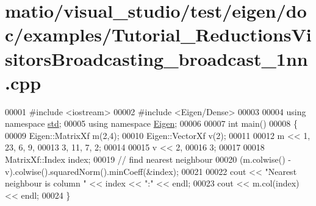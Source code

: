 \hypertarget{matio_2visual__studio_2test_2eigen_2doc_2examples_2_tutorial___reductions_visitors_broadcasting__broadcast__1nn_8cpp_source}{}\section{matio/visual\+\_\+studio/test/eigen/doc/examples/\+Tutorial\+\_\+\+Reductions\+Visitors\+Broadcasting\+\_\+broadcast\+\_\+1nn.cpp}
\label{matio_2visual__studio_2test_2eigen_2doc_2examples_2_tutorial___reductions_visitors_broadcasting__broadcast__1nn_8cpp_source}

\begin{DoxyCode}
00001 \textcolor{preprocessor}{#include <iostream>}
00002 \textcolor{preprocessor}{#include <Eigen/Dense>}
00003 
00004 \textcolor{keyword}{using namespace }\hyperlink{namespacestd}{std};
00005 \textcolor{keyword}{using namespace }\hyperlink{namespace_eigen}{Eigen};
00006 
00007 \textcolor{keywordtype}{int} main()
00008 \{
00009   Eigen::MatrixXf m(2,4);
00010   Eigen::VectorXf v(2);
00011   
00012   m << 1, 23, 6, 9,
00013        3, 11, 7, 2;
00014        
00015   v << 2,
00016        3;
00017 
00018   MatrixXf::Index index;
00019   \textcolor{comment}{// find nearest neighbour}
00020   (m.colwise() - v).colwise().squaredNorm().minCoeff(&index);
00021 
00022   cout << \textcolor{stringliteral}{"Nearest neighbour is column "} << index << \textcolor{stringliteral}{":"} << endl;
00023   cout << m.col(index) << endl;
00024 \}
\end{DoxyCode}
